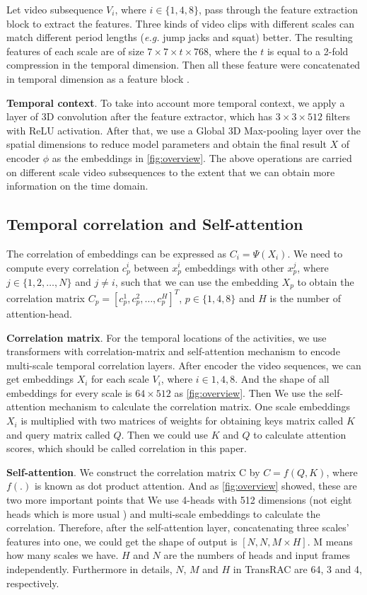 \documentclass[10pt,twocolumn,letterpaper]{article}
\begin{document}
Let video subsequence $V_i$, where $i\in \{1,4,8\}$, pass through the feature extraction block to extract the features. Three kinds of video clips with different scales can  match different period lengths (\emph{e.g.} jump jacks and squat) better. The resulting features of each scale are of size $ 7\times{7} \times {t} \times{768}$, where the $t$ is equal to a 2-fold compression in the temporal dimension. Then all these feature were concatenated in temporal dimension as a feature block . 

\noindent \textbf{Temporal context}.
To take into account more temporal context, we apply a layer of 3D convolution after the feature extractor, which has $3\times3\times512$ filters with ReLU activation. After that, we use a Global 3D Max-pooling layer over the spatial dimensions to reduce model parameters and obtain the final result $X$ of encoder $\phi$ as the embeddings in \cref{fig:overview}. The above operations are carried on different scale video subsequences to the extent that we can obtain more information on the time domain.

\subsection{Temporal correlation and Self-attention}
The correlation of embeddings can be expressed as $C_i = \Psi(X_i)$. We need to compute every correlation $c_p^
{i}$ between $x_p^i$ embeddings with other $x_p^j$, where $j \in \{1,2,\dots,N\}$ and $j \neq i$, such that we can use the embedding $X_p$ to obtain the correlation matrix $C_p = [c_p^1,c_p^2,\dots,c_p^H]^T$, $p\in\{1,4,8\}$ and $H$ is the number of attention-head.

\noindent \textbf{Correlation matrix}.
For the temporal locations of the activities, we use transformers\cite{vaswani2017attention} with correlation-matrix and self-attention mechanism to encode multi-scale temporal correlation layers. After encoder the video sequences, we can get embeddings $X_i$ for each scale $V_i$, where $i\in{1,4,8}$. And the shape of all embeddings for every scale is $64\times512$ as \cref{fig:overview}. Then We use the self-attention mechanism to calculate the correlation matrix. One scale embeddings $X_i$ is multiplied with two matrices of weights for obtaining keys matrix called $K$ and query matrix called $Q$. Then we could use $K$ and $Q$ to calculate attention scores, which should be called correlation in this paper.

\noindent \textbf{Self-attention}.
We construct the correlation matrix C by $C = f(Q,K)$, where $f(.)$ is known as dot product attention. And as \cref{fig:overview} showed, these are two more important points that We use 4-heads with 512 dimensions (not eight heads which is more usual \cite{vaswani2017attention}) and multi-scale embeddings to calculate the correlation. Therefore, after the self-attention layer, concatenating three scales' features into one, we could get the shape of output is $[N, N, M\times H]$. M means how many scales we have. $ H$ and $N$ are the numbers of heads and input frames independently. Furthermore in details, $N$, $M$ and $H$ in TransRAC are 64, 3 and 4, respectively.
\end{document}
